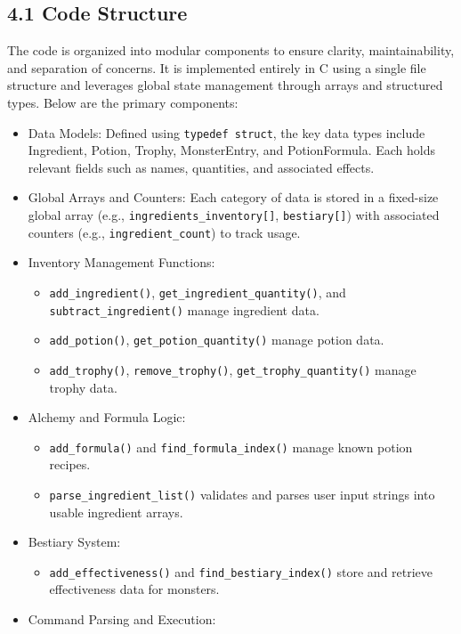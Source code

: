 \documentclass[12pt,a4paper]{article}
\begin{document}
\subsection{4.1 Code Structure}
The code is organized into modular components to ensure clarity, maintainability, and separation of concerns. It is implemented entirely in C using a single file structure and leverages global state management through arrays and structured types. Below are the primary components:
\begin{itemize}
  \item Data Models: Defined using \texttt{typedef struct}, the key data types include Ingredient, Potion, Trophy, MonsterEntry, and PotionFormula. Each holds relevant fields such as names, quantities, and associated effects.
  \item Global Arrays and Counters: Each category of data is stored in a fixed-size global array (e.g., \texttt{ingredients\_inventory[]}, \texttt{bestiary[]}) with associated counters (e.g., \texttt{ingredient\_count}) to track usage.
  \item Inventory Management Functions:
    \begin{itemize}
      \item \texttt{add\_ingredient()}, \texttt{get\_ingredient\_quantity()}, and \texttt{subtract\_ingredient()} manage ingredient data.
      \item \texttt{add\_potion()}, \texttt{get\_potion\_quantity()} manage potion data.
      \item \texttt{add\_trophy()}, \texttt{remove\_trophy()}, \texttt{get\_trophy\_quantity()} manage trophy data.
    \end{itemize}
  \item Alchemy and Formula Logic:
    \begin{itemize}
      \item \texttt{add\_formula()} and \texttt{find\_formula\_index()} manage known potion recipes.
      \item \texttt{parse\_ingredient\_list()} validates and parses user input strings into usable ingredient arrays.
    \end{itemize}
  \item Bestiary System:
    \begin{itemize}
      \item \texttt{add\_effectiveness()} and \texttt{find\_bestiary\_index()} store and retrieve effectiveness data for monsters.
    \end{itemize}
  \item Command Parsing and Execution:

\end{itemize}
\end{document}
